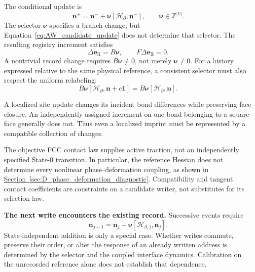 The conditional update is
\begin{equation}
    \mathbf n^{+}
    =\mathbf n^{-}
    +\boldsymbol{\nu}[\mathcal H_{\partial},\mathbf n^{-}],
    \qquad
    \boldsymbol{\nu}\in\mathbb Z^{|V|}.
    \label{eq:AW_candidate_update}
\end{equation}
The selector $\boldsymbol{\nu}$ specifies a branch change, but Equation~\eqref{eq:AW_candidate_update} does not determine that selector. The resulting registry increment satisfies
\begin{equation}
    \Delta\mathbf e_{\mathrm R}=B\boldsymbol{\nu},
    \qquad
    F\Delta\mathbf e_{\mathrm R}=0.
    \label{eq:AW_update_compatibility}
\end{equation}
A nontrivial record change requires $B\boldsymbol{\nu}\neq0$, not merely $\boldsymbol{\nu}\neq0$. For a history expressed relative to the same physical reference, a consistent selector must also respect the uniform relabeling:
\begin{equation}
    B\boldsymbol{\nu}[\mathcal H_{\partial},\mathbf n+c\mathbf 1]
    =B\boldsymbol{\nu}[\mathcal H_{\partial},\mathbf n].
    \label{eq:AW_selector_reference_invariance}
\end{equation}

A localized site update changes its incident bond differences while preserving face closure. An independently assigned increment on one bond belonging to a square face generally does not. Thus even a localized imprint must be represented by a compatible collection of changes.

The objective FCC contact law supplies active traction, not an independently specified State-0 transition. In particular, the reference Hessian does not determine every nonlinear phase--deformation coupling, as shown in \hyperref[sec:D_phase_deformation_diagnostic]{Section~\ref*{sec:D_phase_deformation_diagnostic}}. Compatibility and tangent contact coefficients are constraints on a candidate writer, not substitutes for its selection law.

\medskip
\noindent\textbf{The next write encounters the existing record.}
Successive events require
\begin{equation}
    \mathbf n_{j+1}
    =\mathbf n_j
    +\boldsymbol{\nu}[\mathcal H_{\partial,j},\mathbf n_j].
    \label{eq:AW_repeated_writes}
\end{equation}
State-independent addition is only a special case. Whether writes commute, preserve their order, or alter the response of an already written address is determined by the selector and the coupled interface dynamics. Calibration on the unrecorded reference alone does not establish that dependence.

